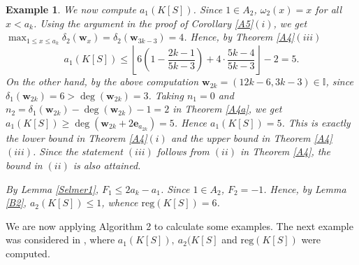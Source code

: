 \documentclass[11pt]{article}
\newtheorem{Example}[Theorem]{Example}
\def\deg{\operatorname{deg}}
\def\reg{\mathrm{reg}}
\def\ebf{{\mathbf e}}
\def\wbf{{\mathbf w}}
\def\Iset{{\mathbb I}}
\theoremstyle{remark}
\theoremstyle{definition}
\begin{document}
\begin{Example}
{We now compute $a_1(K[S])$. Since $1\in A_2$, $\omega_2 (x) = x$ for all $x< a_k$. Using the argument in the proof of Corollary \ref{A5}\((i)\), we get $\max_{1\leq x\leq a_k} \delta_2(\wbf_x) = \delta_2(\wbf_{3k-3}) = 4$. Hence, by Theorem \ref{A4}\((iii)\)
$$a_1(K[S]) \leq  \left\lfloor 6\left( 1- \frac{2k-1}{5k-3} \right)  + 4\cdot\frac{5k-4}{5k-3} \right\rfloor - 2 = 5.$$
On the other hand, by the above computation $\wbf_{2k} = (12k-6,3k-3) \in \Iset$, since $\delta_1(\wbf_{2k}) = 6 > \deg(\wbf_{2k}) = 3$. Taking $n_1 = 0$ and $n_2 = \delta_1(\wbf_{2k}) - \deg(\wbf_{2k}) - 1 = 2$ in Theorem \ref{A4a}, we get $a_1(K[S]) \geq  \deg(\wbf_{2k} + 2\ebf_{a_{2k}}) = 5$. Hence $a_1(K[S])  = 5$. This  is exactly the lower bound in Theorem \ref{A4}\((i)\) and the upper bound in Theorem \ref{A4}\((iii)\). Since the statement \((iii)\) follows from \((ii)\) in Theorem \ref{A4}, the bound in \((ii)\) is also attained.

By Lemma \ref{Selmer1}, $F_1 \leq 2a_k - a_1$. Since $1\in A_2$, $F_2 = -1$. Hence, by Lemma \ref{B2}, $a_2(K[S]) \leq 1$, whence $\reg(K[S]) = 6$.
}
\end{Example}



We are now applying Algorithm 2 to calculate some examples. The next example was considered in \cite[Example 4.3]{BGi}, where $a_1(K[S]), \ a_2(K[S]$ and $\reg(K[S])$ were computed.
\end{document}
